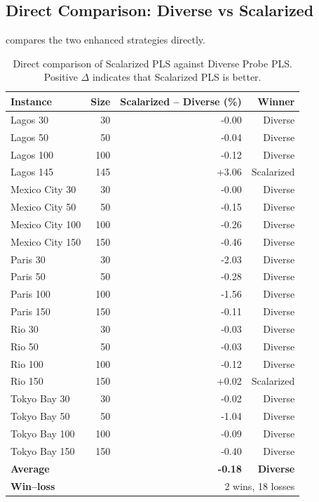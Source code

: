 \documentclass[11pt,a4paper]{article}
\begin{document}
\subsection{Direct Comparison: Diverse vs Scalarized}

 compares the two enhanced strategies directly.

\begin{table}[htbp]
\centering
\caption{Direct comparison of Scalarized PLS against Diverse Probe PLS.
Positive \(\Delta\) indicates that Scalarized PLS is better.}
\label{tab:direct}
\begin{tabular}{lrrr}
\toprule
\textbf{Instance} & \textbf{Size} &
\textbf{Scalarized -- Diverse (\%)} &
\textbf{Winner} \\
\midrule
Lagos 30        &  30 & -0.00 & Diverse \\
Lagos 50        &  50 & -0.04 & Diverse \\
Lagos 100       & 100 & -0.12 & Diverse \\
Lagos 145       & 145 & +3.06 & Scalarized \\
\midrule
Mexico City 30  &  30 & -0.00 & Diverse \\
Mexico City 50  &  50 & -0.15 & Diverse \\
Mexico City 100 & 100 & -0.26 & Diverse \\
Mexico City 150 & 150 & -0.46 & Diverse \\
\midrule
Paris 30        &  30 & -2.03 & Diverse \\
Paris 50        &  50 & -0.28 & Diverse \\
Paris 100       & 100 & -1.56 & Diverse \\
Paris 150       & 150 & -0.11 & Diverse \\
\midrule
Rio 30          &  30 & -0.03 & Diverse \\
Rio 50          &  50 & -0.03 & Diverse \\
Rio 100         & 100 & -0.12 & Diverse \\
Rio 150         & 150 & +0.02 & Scalarized \\
\midrule
Tokyo Bay 30    &  30 & -0.02 & Diverse \\
Tokyo Bay 50    &  50 & -1.04 & Diverse \\
Tokyo Bay 100   & 100 & -0.09 & Diverse \\
Tokyo Bay 150   & 150 & -0.40 & Diverse \\
\midrule
\multicolumn{2}{l}{\textbf{Average}} & \textbf{-0.18} & \textbf{Diverse} \\
\multicolumn{2}{l}{\textbf{Win--loss}} & \multicolumn{2}{r}{2 wins, 18 losses} \\
\bottomrule
\end{tabular}
\end{table}
\end{document}
